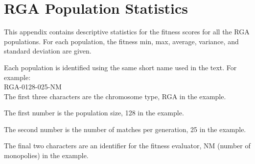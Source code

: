 \clearpage
\chapter{RGA Population Statistics}
\label{appendix:rgastats}

This appendix contains descriptive statistics for the fitness scores for all the
RGA populations. For each population, the fitness min, max, average, variance,
and standard deviation are given.

Each population is identified using the same short name used in the text. For
example: \\ 

RGA-0128-025-NM \\ 

The first three characters are the chromosome type, RGA in the example.

The first number is the population size, 128 in the example.

The second number is the number of matches per generation, 25 in the example.

The final two characters are an identifier for the fitness evaluator, NM
(number of monopolies) in the example.

\newpage



















